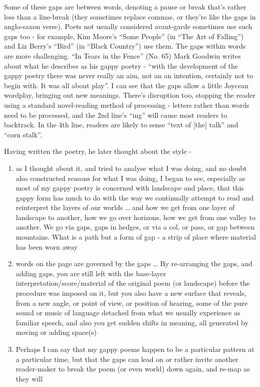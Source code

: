 \documentclass[11pt]{article}
\begin{document}
Some of these gaps are between words, denoting a pause or break that's rather less than a line-break (they sometimes replace commas, or they're like the gaps in anglo-saxon verse). Poets not usually considered avant-garde sometimes use such gaps too - for example, Kim Moore's ``Some People'' (in ``The Art of Falling'') and  Liz Berry's ``Bird'' (in ``Black Country'') use them.  The gaps within words are more challenging. ``In Tears in the Fence'' (No. 65) Mark Goodwin writes about what he describes as his gappy poetry - ``with the development of the gappy poetry there was never really an aim, not an an intention, certainly not to begin with. It was all about play''. I can see that the gaps allow a little Joycean wordplay, bringing out new meanings. There's disruption too, stopping the reader using a standard novel-reading method of processing - letters rather than words need to be processed, and the 2nd line's ``ing'' will cause most readers to backtrack. In the 4th line, readers are likely to sense ``text of [the] talk'' and ``corn stalk''.

Having written the poetry, he later thought about the style -

\begin{enumerate}
\item
as I thought about it, and tried to analyse what I was doing, and no doubt also constructed reasons for what I was doing, I began to see, especially as most of my gappy poetry is concerned with landscape and place, that this gappy form has much to do with the way we continually attempt to read and reinterpret the layers of our worlds … and how we get from one layer of landscape to another, how we go over horizons, how we get from one valley to another. We go via gaps, gaps in hedges, or via a col, or pass, or gap between mountains. What is a path but a form of gap - a strip of place where material has been worn away

\item words on the page are governed by the gaps … By re-arranging the gaps, and adding gaps, you are still left with the base-layer interpretation/score/material of the original poem (or landscape) before the procedure was imposed on it, but you also have a new surface that reveals, from a new angle, or point of view, or position of hearing, some of the pure sound or music of language detached from what we usually experience as familiar speech, and also you get sudden shifts in meaning, all generated by moving or adding space(s)

\item Perhaps I can say that my gappy poems happen to be a particular pattern at a particular time, but that the gaps can lead on or rather invite another reader-maker to break the poem (or even world) down again, and re-map as they will
\end{enumerate}
\end{document}
